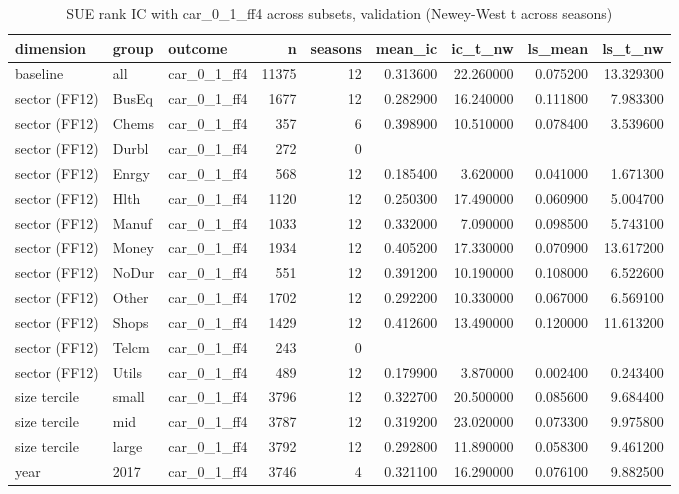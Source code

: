 \begin{table}
\caption{SUE rank IC with car_0_1_ff4 across subsets, validation (Newey-West t across seasons)}
\label{tab:cd_surprise_robustness__validation}
\begin{tabular}{lllrrrrrr}
\toprule
dimension & group & outcome & n & seasons & mean\_ic & ic\_t\_nw & ls\_mean & ls\_t\_nw \\
\midrule
baseline & all & car\_0\_1\_ff4 & 11375 & 12 & 0.313600 & 22.260000 & 0.075200 & 13.329300 \\
sector (FF12) & BusEq & car\_0\_1\_ff4 & 1677 & 12 & 0.282900 & 16.240000 & 0.111800 & 7.983300 \\
sector (FF12) & Chems & car\_0\_1\_ff4 & 357 & 6 & 0.398900 & 10.510000 & 0.078400 & 3.539600 \\
sector (FF12) & Durbl & car\_0\_1\_ff4 & 272 & 0 &  &  &  &  \\
sector (FF12) & Enrgy & car\_0\_1\_ff4 & 568 & 12 & 0.185400 & 3.620000 & 0.041000 & 1.671300 \\
sector (FF12) & Hlth & car\_0\_1\_ff4 & 1120 & 12 & 0.250300 & 17.490000 & 0.060900 & 5.004700 \\
sector (FF12) & Manuf & car\_0\_1\_ff4 & 1033 & 12 & 0.332000 & 7.090000 & 0.098500 & 5.743100 \\
sector (FF12) & Money & car\_0\_1\_ff4 & 1934 & 12 & 0.405200 & 17.330000 & 0.070900 & 13.617200 \\
sector (FF12) & NoDur & car\_0\_1\_ff4 & 551 & 12 & 0.391200 & 10.190000 & 0.108000 & 6.522600 \\
sector (FF12) & Other & car\_0\_1\_ff4 & 1702 & 12 & 0.292200 & 10.330000 & 0.067000 & 6.569100 \\
sector (FF12) & Shops & car\_0\_1\_ff4 & 1429 & 12 & 0.412600 & 13.490000 & 0.120000 & 11.613200 \\
sector (FF12) & Telcm & car\_0\_1\_ff4 & 243 & 0 &  &  &  &  \\
sector (FF12) & Utils & car\_0\_1\_ff4 & 489 & 12 & 0.179900 & 3.870000 & 0.002400 & 0.243400 \\
size tercile & small & car\_0\_1\_ff4 & 3796 & 12 & 0.322700 & 20.500000 & 0.085600 & 9.684400 \\
size tercile & mid & car\_0\_1\_ff4 & 3787 & 12 & 0.319200 & 23.020000 & 0.073300 & 9.975800 \\
size tercile & large & car\_0\_1\_ff4 & 3792 & 12 & 0.292800 & 11.890000 & 0.058300 & 9.461200 \\
year & 2017 & car\_0\_1\_ff4 & 3746 & 4 & 0.321100 & 16.290000 & 0.076100 & 9.882500 \\

\end{tabular}
\end{table}

